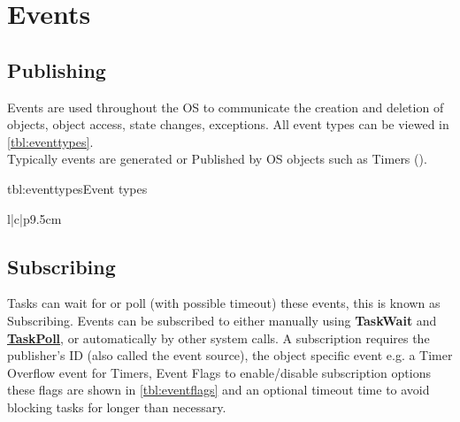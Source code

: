 \chapter{Events}

\section{Publishing}
Events are used throughout the OS to communicate the creation and deletion of objects, object access, state changes, exceptions. All event types can be viewed in \cref{tbl:eventtypes}.\\
Typically events are generated or Published by OS objects such as Timers (). 


\begin{pdtable}{tbl:eventtypes}{Event types}
	\begin{pdtabular}{l|c|p{9.5cm}}
	\end{pdtabular}
\end{pdtable}

\FloatBarrier
\section{Subscribing}
Tasks can wait for or poll (with possible timeout) these events, this is known as Subscribing. Events can be subscribed to either manually using \textbf{TaskWait} and \hyperref[func:TaskPoll]{\textbf{TaskPoll}}, or automatically by other system calls. A subscription requires the publisher's ID (also called the event source), the object specific event e.g. a Timer Overflow event for Timers, Event Flags to enable/disable subscription options these flags are shown in \cref{tbl:eventflags} and an optional timeout time to avoid blocking tasks for longer than necessary.\\


